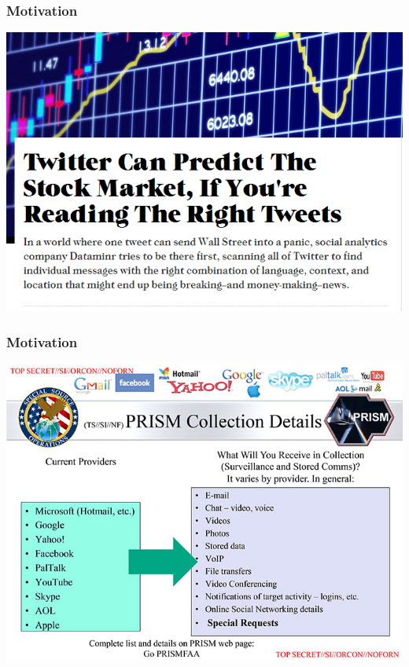 \documentclass[handout]{beamer}
\begin{document}
\begin{frame}
\frametitle{Motivation}
\pause
\begin{center}
\includegraphics[height=.8\textheight]{Images/twitter_fastco.PNG}
\end{center}
\end{frame}

\begin{frame}
\frametitle{Motivation}
\pause
\begin{center}
\includegraphics[height=.8\textheight]{Images/PRISM.jpg}
\end{center}
\end{frame}
\end{document}
